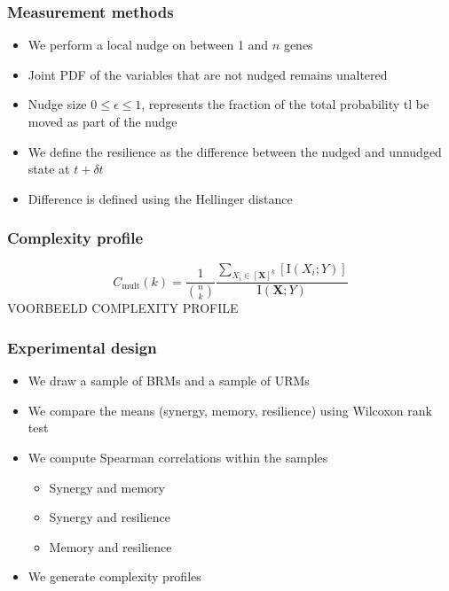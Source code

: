 \documentclass[hyperref={pdfpagelabels=false}]{beamer}
\begin{document}
\begin{frame}
\frametitle{Measurement methods}
\begin{itemize}
\item We perform a local nudge on between 1 and $n$ genes
\item Joint PDF of the variables that are not nudged remains unaltered
\item Nudge size $0 \le \epsilon \le 1$, represents the fraction of the total probability tl be moved as part of the nudge
\item We define the resilience as the difference between the nudged and unnudged state at $t + \delta t$
\item Difference is defined using the Hellinger distance
\end{itemize}
\end{frame}

\begin{frame}
\frametitle{Complexity profile}
%
\begin{equation}
C_\mathrm{mult}(k) = \frac{1}{\binom{n}{k}}\frac{\sum_{X_i \in [\mathbf{X}]^k} [\mathrm{I}\left( X_i;Y \right)]}{\mathrm{I}\left( \mathbf{X};Y\right)}
\end{equation}
VOORBEELD COMPLEXITY PROFILE
\end{frame}

\begin{frame}
\frametitle{Experimental design}
\begin{itemize}
\item We draw a sample of BRMs and a sample of URMs
\item We compare the means (synergy, memory, resilience) using Wilcoxon rank test
\item We compute Spearman correlations within the samples
\begin{itemize}
\item Synergy and memory
\item Synergy and resilience
\item Memory and resilience
\end{itemize}
\item We generate complexity profiles
\end{itemize}
\end{frame}
\end{document}
